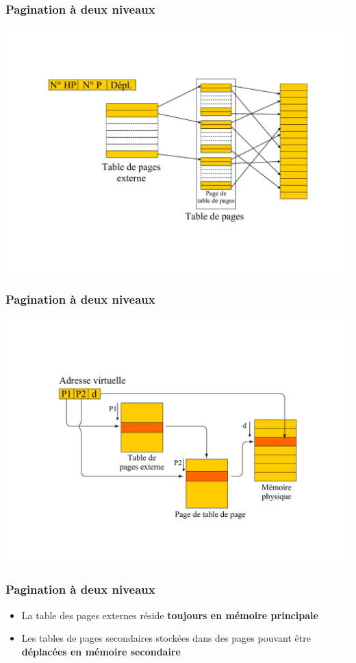 \begin{frame}
\frametitle{Pagination à deux niveaux}
\includegraphics[width=\textwidth]{../illustration/pagination_2_niveaux.pdf}
\end{frame}


\begin{frame}
\frametitle{Pagination à deux niveaux}
\includegraphics[width=\textwidth]{../illustration/memoire_paginee_deux_niveaux_calcul.pdf}
\end{frame}


\begin{frame}
\frametitle{Pagination à deux niveaux}
\begin{itemize}
\item La table des pages externes réside \textbf{toujours en mémoire principale}
\item Les tables de pages secondaires stockées dans des pages pouvant être \textbf{déplacées en mémoire secondaire}
\end{itemize}
\end{frame}


